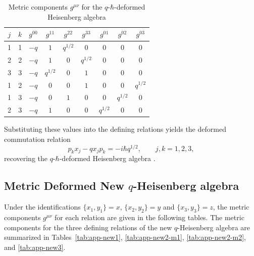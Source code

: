 \documentclass[12pt,a4paper]{article}
\theoremstyle{plain}
\theoremstyle{definition}
\begin{document}
\begin{table}[H]
\centering
\small
\caption{Metric components $g^{\mu\nu}$ for the $q$-$\hbar$-deformed Heisenberg algebra}
\label{tab:app-qhbar}
\begin{tabular}{|c|c|c|c|c|c|c|c|c|}
\hline
$j$ & $k$ & $g^{00}$ & $g^{11}$ & $g^{22}$ & $g^{33}$ & $g^{01}$ & $g^{02}$ & $g^{03}$ \\
\hline
1 & 1 & $-q$ & $1$ & $q^{1/2}$ & $0$ & $0$ & $0$ & $0$ \\
\hline
2 & 2 & $-q$ & $1$ & $0$ & $q^{1/2}$ & $0$ & $0$ & $0$ \\
\hline
3 & 3 & $-q$ & $q^{1/2}$ & $0$ & $1$ & $0$ & $0$ & $0$ \\
\hline
1 & 2 & $-q$ & $0$ & $0$ & $1$ & $0$ & $0$ & $q^{1/2}$ \\
\hline
1 & 3 & $-q$ & $0$ & $1$ & $0$ & $0$ & $q^{1/2}$ & $0$ \\
\hline
2 & 3 & $-q$ & $1$ & $0$ & $0$ & $q^{1/2}$ & $0$ & $0$ \\
\hline
\end{tabular}
\end{table}

Substituting these values into the defining relations yields the deformed commutation relation
\[
p_k x_j - q x_j p_k = -i \hbar q^{1/2}, \qquad j,k = 1,2,3,
\]
recovering the $q$-$\hbar$-deformed Heisenberg algebra \cite{Volovich-Arefeva-91, Jaramillo2025, Jaramillo2026a}.

\subsection{Metric Deformed New $q$-Heisenberg algebra}
Under the identifications $\{x_{1},y_{1}\}=x$, $\{x_{2},y_{2}\}=y$ and $\{x_{3},y_{3}\}=z$, the metric components $g^{\mu\nu}$ for each relation are given in the following tables. The metric components for the three defining relations of the new $q$-Heisenberg algebra are summarized in Tables~\ref{tab:app-new1}, \ref{tab:app-new2-m1}, \ref{tab:app-new2-m2}, and \ref{tab:app-new3}.
\end{document}
